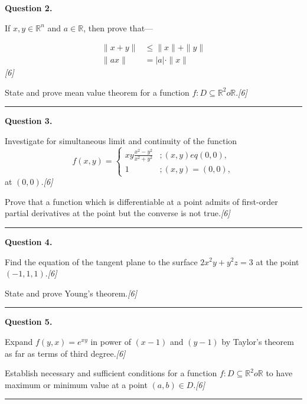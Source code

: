 \documentclass[11pt,a4paper]{article}
\newcommand{\pts}[1]{\hfill   \textit{[#1]}}
\begin{document}
\noindent   \textbf{Question 2.}

\begin{parts}
  \item If $x, y \in \mathbb{R}^n$ and $a \in \mathbb{R}$, then prove that---
  
\begin{align*}
    \|x + y\| &\le \|x\| + \|y\| \\
    \|ax\| &= |a| \cdot \|x\|
  \end{align*}\pts{6}
  \item State and prove mean value theorem for a function $f : D \subseteq \mathbb{R}^2  o \mathbb{R}$.\pts{6}
\end{parts}
\medskip\rule{\linewidth}{0.2pt}

\medskip


\noindent   \textbf{Question 3.}

\begin{parts}
  \item Investigate for simultaneous limit and continuity of the function
  \[
    f(x,y) = 
\begin{cases}
      xy \frac{x^2 - y^2}{x^2 + y^2} & ; (x,y) 
eq (0,0), \\
      1 & ; (x,y) = (0,0),
    \end{cases}
  \]
  at $(0,0)$.\pts{6}
  \item Prove that a function which is differentiable at a point admits of first-order partial derivatives at the point but the converse is not true.\pts{6}
\end{parts}
\medskip\rule{\linewidth}{0.2pt}

\medskip


\noindent   \textbf{Question 4.}

\begin{parts}
  \item Find the equation of the tangent plane to the surface $2x^2 y + y^2 z = 3$ at the point $(-1, 1, 1)$.\pts{6}
  \item State and prove Young's theorem.\pts{6}
\end{parts}
\medskip\rule{\linewidth}{0.2pt}

\medskip


\noindent   \textbf{Question 5.}

\begin{parts}
  \item Expand $f(y, x) = e^{xy}$ in power of $(x-1)$ and $(y-1)$ by Taylor's theorem as far as terms of third degree.\pts{6}
  \item Establish necessary and sufficient conditions for a function $f : D \subseteq \mathbb{R}^2  o \mathbb{R}$ to have maximum or minimum value at a point $(a,b) \in D$.\pts{6}
\end{parts}
\medskip\rule{\linewidth}{0.2pt}
\end{document}
